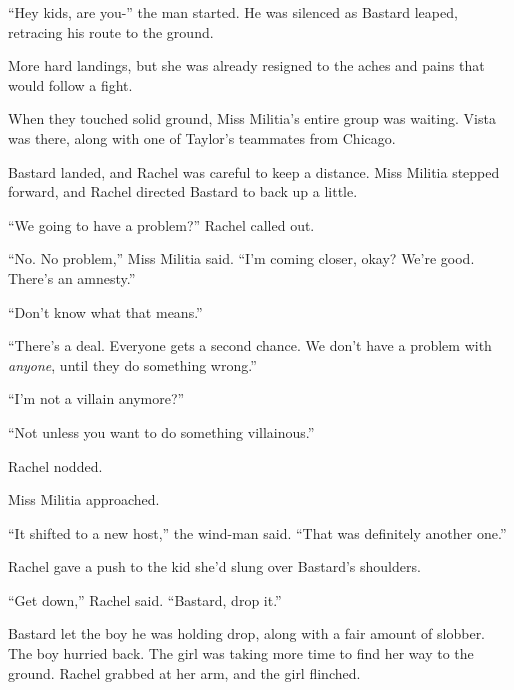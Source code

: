``Hey kids, are you-'' the man started.  He was silenced as Bastard leaped, retracing his route to the ground.



More hard landings, but she was already resigned to the aches and pains that would follow a fight.



When they touched solid ground, Miss Militia's entire group was waiting.  Vista was there, along with one of Taylor's teammates from Chicago.



Bastard landed, and Rachel was careful to keep a distance.  Miss Militia stepped forward, and Rachel directed Bastard to back up a little.



``We going to have a problem?'' Rachel called out.



``No.  No problem,'' Miss Militia said.  ``I'm coming closer, okay?  We're good.  There's an amnesty.''



``Don't know what that means.''



``There's a deal.  Everyone gets a second chance.  We don't have a problem with \emph{anyone}, until they do something wrong.''



``I'm not a villain anymore?''



``Not unless you want to do something villainous.''



Rachel nodded.



Miss Militia approached.



``It shifted to a new host,'' the wind-man said.  ``That was definitely another one.''



Rachel gave a push to the kid she'd slung over Bastard's shoulders.



``Get down,'' Rachel said.  ``Bastard, drop it.''



Bastard let the boy he was holding drop, along with a fair amount of slobber.  The boy hurried back.  The girl was taking more time to find her way to the ground.  Rachel grabbed at her arm, and the girl flinched.



